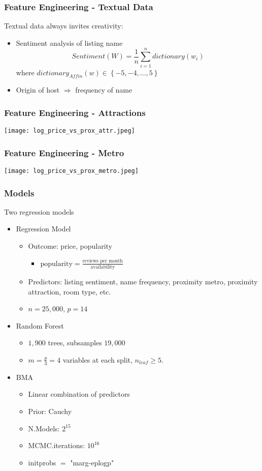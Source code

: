 \documentclass{beamer}
\begin{document}
\begin{frame}
\frametitle{Feature Engineering - Textual Data}
Textual data always invites creativity:
\begin{itemize}
	\item Sentiment analysis of listing name
	$$ Sentiment(W) = \dfrac{1}{n}\sum_{i=1}^{n} dictionary(w_i)$$
	where $dictionary_{Affin}(w) \in \left\lbrace -5, -4, \dots, 5\right\rbrace$
	\item Origin of host $\Rightarrow$ frequency of name
\end{itemize}
\end{frame}

\begin{frame}
    \frametitle{Feature Engineering - Attractions}
    \texttt{[image: log\_price\_vs\_prox\_attr.jpeg]}
\end{frame}

\begin{frame}
    \frametitle{Feature Engineering - Metro}
    \texttt{[image: log\_price\_vs\_prox\_metro.jpeg]}
\end{frame}

\begin{frame}
\frametitle{Models}
Two regression models
\begin{itemize}
	\item Regression Model
	\begin{itemize}
		\item Outcome: price, popularity
		\begin{itemize}
            \item $\text{popularity} = \frac{\text{reviews per month}}{\text{availability}}$
        \end{itemize}
		\item Predictors: listing sentiment, name frequency, proximity metro, proximity attraction, room type, etc.
		\item $n = 25,000$, $p=14$
	\end{itemize}
	\item Random Forest
	\begin{itemize}
		\item $1,900$ trees, subsamples $19,000$
		\item $m=\frac{p}{3}=4$ variables at each split, $n_{leaf} \ge 5$.
	\end{itemize}
	\item BMA
	\begin{itemize}
		\item Linear combination of predictors
		\item Prior: Cauchy
		\item N.Models: $2^{15}$
		\item MCMC.iterations: $10^{16}$
		\item initprobs $=$ "marg-eplogp"
	\end{itemize}
\end{itemize}
\end{frame}
\end{document}
